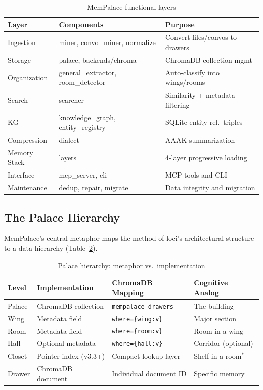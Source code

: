 \documentclass[twoside,11pt]{article}
\begin{document}
\begin{table}[t]
\centering
\caption{MemPalace functional layers}
\label{tab:arch-layers}
\small
\begin{tabular}{@{}l >{\ttfamily\footnotesize}l l@{}}
\toprule
\textbf{Layer} & \textrm{\textbf{Components}} & \textbf{Purpose} \\
\midrule
Ingestion    & miner, convo\_miner, normalize   & Convert files/convos to drawers \\
Storage      & palace, backends/chroma          & ChromaDB collection mgmt \\
Organization & general\_extractor, room\_detector & Auto-classify into wings/rooms \\
Search       & searcher                         & Similarity + metadata filtering \\
KG           & knowledge\_graph, entity\_registry & SQLite entity-rel.\ triples \\
Compression  & dialect                          & AAAK summarization \\
Memory Stack & layers                           & 4-layer progressive loading \\
Interface    & mcp\_server, cli                  & MCP tools and CLI \\
Maintenance  & dedup, repair, migrate            & Data integrity and migration \\
\bottomrule
\end{tabular}
\end{table}

\subsection{The Palace Hierarchy}
\label{sec:hierarchy}

MemPalace's central metaphor maps the method of loci's architectural structure
to a data hierarchy (Table~\ref{tab:hierarchy}).

\begin{table}[t]
\centering
\caption{Palace hierarchy: metaphor vs.\ implementation}
\label{tab:hierarchy}
\small
\begin{tabular}{@{}llll@{}}
\toprule
\textbf{Level} & \textbf{Implementation} & \textbf{ChromaDB Mapping} & \textbf{Cognitive Analog} \\
\midrule
Palace  & ChromaDB collection     & \texttt{mempalace\_drawers}  & The building \\
Wing    & Metadata field          & \texttt{where=\{wing:v\}}    & Major section \\
Room    & Metadata field          & \texttt{where=\{room:v\}}    & Room in a wing \\
Hall    & Optional metadata       & \texttt{where=\{hall:v\}}    & Corridor (optional) \\
Closet  & Pointer index (v3.3+)  & Compact lookup layer          & Shelf in a room$^{*}$ \\
Drawer  & ChromaDB document       & Individual document ID        & Specific memory \\
\bottomrule
\end{tabular}
\end{table}
\end{document}
